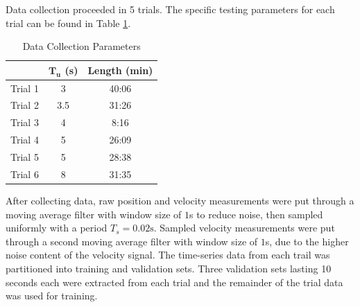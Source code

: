Data collection proceeded in 5 trials. The specific testing parameters for each trial can be found in Table \ref{tab:trialParams}.

\begin{table}[h]
    \centering
    \caption{Data Collection Parameters}
    \begin{tabular}{|c||c|c|}
        \hline
         & $\bm{T_u}$ \textbf{(s)} & \textbf{Length (min)} \\
        \hline
         Trial 1 & 3 & 40:06 \\
         Trial 2 & 3.5 & 31:26 \\
         Trial 3 & 4 & 8:16 \\
         Trial 4 & 5 & 26:09 \\
         Trial 5 & 5 & 28:38 \\
         Trial 6 & 8 & 31:35 \\
        \hline
    \end{tabular}
    \label{tab:trialParams}
\end{table}

After collecting data, raw position and velocity measurements were put through a moving average filter with window size of $1$s to reduce noise, then sampled uniformly with a period $T_s = 0.02 \text{s}$.
Sampled velocity measurements were put through a second moving average filter with window size of $1$s, due to the higher noise content of the velocity signal.
The time-series data from each trail was partitioned into training and validation sets. 
Three validation sets lasting 10 seconds each were extracted from each trial and the remainder of the trial data was used for training.

